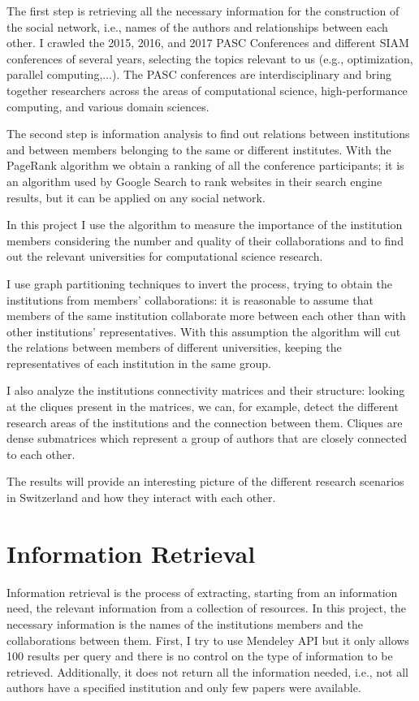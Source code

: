 \documentclass[]{usiinfbachelorproject}
\begin{document}
The first step is retrieving all the necessary information for the construction of the social network, i.e., names of the authors and relationships between each other. I crawled the 2015, 2016, and 2017 PASC Conferences and different SIAM conferences of several years, selecting the topics relevant to us (e.g., optimization, parallel computing,...). The PASC conferences are interdisciplinary and bring together researchers across the areas of computational science, high-performance computing, and various domain sciences.

The second step is information analysis to find out relations between institutions and between members belonging to the same or different institutes. With the PageRank algorithm we obtain a ranking of all the conference participants; it is an algorithm used by Google Search to rank websites in their search engine results, but it can be applied on any social network. 

In this project I use the algorithm to measure the importance of the institution members considering the number and quality of their collaborations and to find out the relevant universities for computational science research. 

I use graph partitioning techniques to invert the process, trying to obtain the institutions from members' collaborations: it is reasonable to assume that members of the same institution collaborate more between each other than with other institutions' representatives. With this assumption the algorithm will cut the relations between members of different universities, keeping the representatives of each institution in the same group.

I also analyze the institutions connectivity matrices and their structure: looking at the cliques present in the matrices, we can, for example, detect the different research areas of the institutions and the connection between them. Cliques are dense submatrices which represent a group of authors that are closely connected to each other. 

The results will provide an interesting picture of the different research scenarios in Switzerland and how they interact with each other.






\section{Information Retrieval} \label{sec:inforetrieval} 
Information retrieval is the process of extracting, starting from an information need, the relevant information from a collection of resources. In this project, the necessary information is the names of the institutions members and the collaborations between them. 
First, I try to use Mendeley API but it only allows 100 results per query and there is no control on the type of information to be retrieved. Additionally, it does not return all the information needed, i.e., not all authors have a specified institution and only few papers were available.
\end{document}
